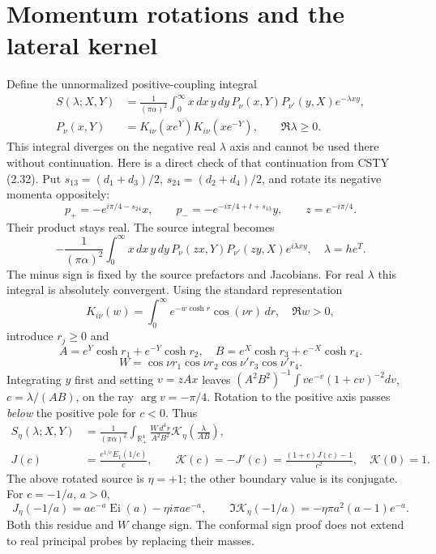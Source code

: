 \documentclass[11pt,a4paper]{article}
\newcommand{\K}{\mathcal K}
\begin{document}
\newpage
\section{Momentum rotations and the lateral kernel}
Define the unnormalized positive-coupling integral
\begin{align}
 S(\lambda;X,Y)&=\frac{1}{(\pi\alpha)^2}
 \int_0^\infty x\,dx\,y\,dy\,P_\nu(x,Y)P_{\nu'}(y,X)e^{-\lambda xy},\label{eq:S}\\
 P_\nu(x,Y)&=K_{i\nu}(xe^Y)K_{i\nu}(xe^{-Y}),\qquad \Re\lambda\geq0.\nonumber
\end{align}
This integral diverges on the negative real $\lambda$ axis and cannot
be used there without continuation. Here is a direct check of that
continuation from CSTY (2.32). Put $s_{13}=(d_1+d_3)/2$,
$s_{24}=(d_2+d_4)/2$, and rotate its negative momenta oppositely:
\[
 p_+=-e^{i\pi/4-s_{24}}x,\qquad
 p_-=-e^{-i\pi/4+t+s_{13}}y,\qquad z=e^{-i\pi/4}.
\]
Their product stays real. The source integral becomes
\[
 -\frac{1}{(\pi\alpha)^2}\int_0^\infty x\,dx\,y\,dy\,
 P_\nu(zx,Y)P_{\nu'}(zy,X)e^{i\lambda xy},\quad \lambda=he^T.
\]
The minus sign is fixed by the source prefactors and Jacobians.
For real $\lambda$ this integral is absolutely convergent. Using the
standard representation \cite{dlmfK}
\[
 K_{i\nu}(w)=\int_0^\infty e^{-w\cosh r}\cos(\nu r)\,dr,
 \quad \Re w>0,
\]
introduce $r_j\geq0$ and
\[
 A=e^Y\cosh r_1+e^{-Y}\cosh r_2,\quad
 B=e^X\cosh r_3+e^{-X}\cosh r_4.
\]
\[
 W=\cos\nu r_1\cos\nu r_2\cos\nu'r_3\cos\nu'r_4.
\]
Integrating $y$ first and setting $v=zAx$ leaves
$(A^2B^2)^{-1}\int v e^{-v}(1+cv)^{-2}dv$, $c=\lambda/(AB)$,
on the ray $\arg v=-\pi/4$. Rotation to the positive axis passes
\emph{below} the positive pole for $c<0$. Thus
\begin{align}
 S_\eta(\lambda;X,Y)&=\frac{1}{(\pi\alpha)^2}
 \int_{\mathbb R_+^4}\frac{W\,d^4r}{A^2B^2}\K_\eta\left(\frac\lambda{AB}\right),\label{eq:rapid}\\
 J(c)&=\frac{e^{1/c}E_1(1/c)}c,\qquad
 \K(c)=-J'(c)=\frac{(1+c)J(c)-1}{c^2},\quad \K(0)=1.\nonumber
\end{align}
The above rotated source is $\eta=+1$; the other boundary value is its
conjugate. For $c=-1/a$, $a>0$,
\[
 J_\eta(-1/a)=ae^{-a}\operatorname{Ei}(a)-\eta i\pi ae^{-a},\qquad
 \Im\K_\eta(-1/a)=-\eta\pi a^2(a-1)e^{-a}.
\]
Both this residue and $W$ change sign. The conformal sign proof does
not extend to real principal probes by replacing their masses.

\newpage
\end{document}
